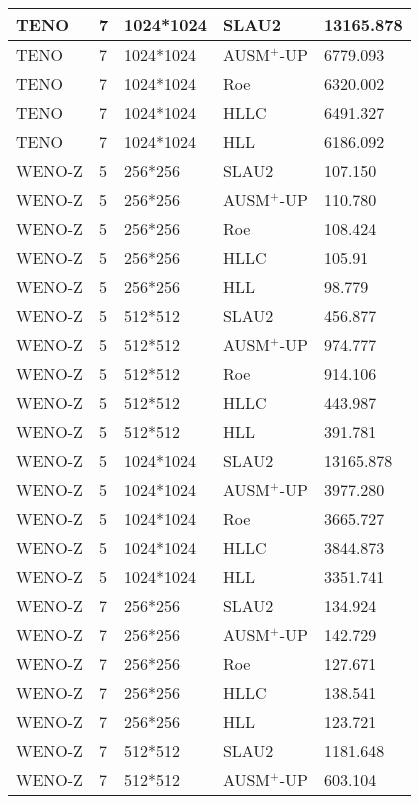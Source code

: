 \begin{table}[!ht]
\begin{tabular}{|l|l|l|l|l|}
        TENO & 7 & 1024*1024 & SLAU2 & 13165.878 \\ \hline
        TENO & 7 & 1024*1024 & AUSM$^+$-UP & 6779.093 \\ \hline
        TENO & 7 & 1024*1024 & Roe & 6320.002 \\ \hline
        TENO & 7 & 1024*1024 & HLLC & 6491.327 \\ \hline
        TENO & 7 & 1024*1024 & HLL & 6186.092 \\ \hline
        WENO-Z & 5 & 256*256 & SLAU2 & 107.150 \\ \hline
        WENO-Z & 5 & 256*256 & AUSM$^+$-UP & 110.780 \\ \hline
        WENO-Z & 5 & 256*256 & Roe & 108.424 \\ \hline
        WENO-Z & 5 & 256*256 & HLLC & 105.91 \\ \hline
        WENO-Z & 5 & 256*256 & HLL & 98.779 \\ \hline
        WENO-Z & 5 & 512*512 & SLAU2 & 456.877 \\ \hline
        WENO-Z & 5 & 512*512 & AUSM$^+$-UP & 974.777 \\ \hline
        WENO-Z & 5 & 512*512 & Roe & 914.106 \\ \hline
        WENO-Z & 5 & 512*512 & HLLC & 443.987 \\ \hline
        WENO-Z & 5 & 512*512 & HLL & 391.781 \\ \hline
        WENO-Z & 5 & 1024*1024 & SLAU2 & 13165.878 \\ \hline
        WENO-Z & 5 & 1024*1024 & AUSM$^+$-UP & 3977.280 \\ \hline
        WENO-Z & 5 & 1024*1024 & Roe & 3665.727 \\ \hline
        WENO-Z & 5 & 1024*1024 & HLLC & 3844.873 \\ \hline
        WENO-Z & 5 & 1024*1024 & HLL & 3351.741 \\ \hline
        WENO-Z & 7 & 256*256 & SLAU2 & 134.924 \\ \hline
        WENO-Z & 7 & 256*256 & AUSM$^+$-UP & 142.729 \\ \hline
        WENO-Z & 7 & 256*256 & Roe & 127.671 \\ \hline
        WENO-Z & 7 & 256*256 & HLLC & 138.541 \\ \hline
        WENO-Z & 7 & 256*256 & HLL & 123.721 \\ \hline
        WENO-Z & 7 & 512*512 & SLAU2 & 1181.648 \\ \hline
        WENO-Z & 7 & 512*512 & AUSM$^+$-UP & 603.104 \\ \hline

\end{tabular}
\end{table}
